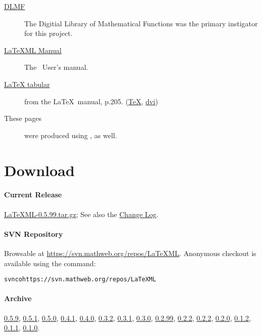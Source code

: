 \documentclass{article}
\newcommand{\current}{0.5.99}
\begin{document}
\begin{description}
\item[\href{http://dlmf.nist.gov/contents/}{DLMF}]
   The Digitial Library of Mathematical Functions was the
   primary instigator for this project.
\item[\href{manual/}{LaTeXML Manual}]
   The \LaTeXML\ User's manual.
\item[\href{examples/tabular/tabular.xhtml}{LaTeX tabular}]
    from the \LaTeX\ manual, p.205.
    (\href{examples/tabular/tabular.tex}{\TeX},
     \href{examples/tabular/tabular.dvi}{dvi})
\item[These pages] were produced using \LaTeXML, as well.
\end{description}

\section{Download}\label{download}
\paragraph{Current Release}
\href{LaTeXML-\current.tar.gz}{LaTeXML-\current.tar.gz};
See also the \href{Changes}{Change Log}.

\paragraph{SVN Repository}
Browsable at \url{https://svn.mathweb.org/repos/LaTeXML}.
Anonymous checkout is available using the command:
\begin{alltt}
  svn co https://svn.mathweb.org/repos/LaTeXML
\end{alltt}

\paragraph{Archive}
\href{archive/LaTeXML-0.5.1.tar.gz}{0.5.9},
\href{archive/LaTeXML-0.5.1.tar.gz}{0.5.1},
\href{archive/LaTeXML-0.5.0.tar.gz}{0.5.0},
\href{archive/LaTeXML-0.4.1.tar.gz}{0.4.1},
\href{archive/LaTeXML-0.4.0.tar.gz}{0.4.0},
\href{archive/LaTeXML-0.3.2.tar.gz}{0.3.2},
\href{archive/LaTeXML-0.3.1.tar.gz}{0.3.1},
\href{archive/LaTeXML-0.3.0.tar.gz}{0.3.0},
\href{archive/LaTeXML-0.2.99.tar.gz}{0.2.99},
\href{archive/LaTeXML-0.2.2.tar.gz}{0.2.2},
\href{archive/LaTeXML-0.2.1.tar.gz}{0.2.2},
\href{archive/LaTeXML-0.2.0.tar.gz}{0.2.0},
\href{archive/LaTeXML-0.1.2.tar.gz}{0.1.2},
\href{archive/LaTeXML-0.1.1.tar.gz}{0.1.1},
\href{archive/LaTeXML-0.1.0.tar.gz}{0.1.0}.
\end{document}
